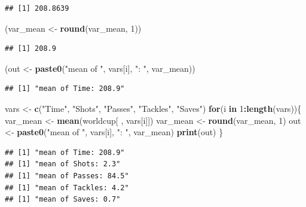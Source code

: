 \documentclass[]{book}
\makeatletter
\newenvironment{Shaded}{\begin{snugshade}}{\end{snugshade}}
\newcommand{\KeywordTok}[1]{\textcolor[rgb]{0.13,0.29,0.53}{\textbf{#1}}}
\newcommand{\DecValTok}[1]{\textcolor[rgb]{0.00,0.00,0.81}{#1}}
\newcommand{\StringTok}[1]{\textcolor[rgb]{0.31,0.60,0.02}{#1}}
\newcommand{\ControlFlowTok}[1]{\textcolor[rgb]{0.13,0.29,0.53}{\textbf{#1}}}
\newcommand{\OperatorTok}[1]{\textcolor[rgb]{0.81,0.36,0.00}{\textbf{#1}}}
\newcommand{\NormalTok}[1]{#1}
\newenvironment{kframe}{%
\medskip{}
\setlength{\fboxsep}{.8em}
 \def\at@end@of@kframe{}%
 \ifinner\ifhmode%
  \def\at@end@of@kframe{\end{minipage}}%
  \begin{minipage}{\columnwidth}%
 \fi\fi%
 \def\FrameCommand##1{\hskip\@totalleftmargin \hskip-\fboxsep
 \colorbox{shadecolor}{##1}\hskip-\fboxsep
     \hskip-\linewidth \hskip-\@totalleftmargin \hskip\columnwidth}%
 \MakeFramed {\advance\hsize-\width
   \@totalleftmargin\z@ \linewidth\hsize
   \@setminipage}}%
 {\par\unskip\endMakeFramed%
 \at@end@of@kframe}
\renewenvironment{Shaded}{\begin{kframe}}{\end{kframe}}
\theoremstyle{definition}
\theoremstyle{definition}
\theoremstyle{definition}
\theoremstyle{remark}
\makeatother
\begin{document}
\begin{verbatim}
## [1] 208.8639
\end{verbatim}

\begin{Shaded}
\begin{Highlighting}[]
\NormalTok{(var_mean <-}\StringTok{ }\KeywordTok{round}\NormalTok{(var_mean, }\DecValTok{1}\NormalTok{))}
\end{Highlighting}
\end{Shaded}

\begin{verbatim}
## [1] 208.9
\end{verbatim}

\begin{Shaded}
\begin{Highlighting}[]
\NormalTok{(out <-}\StringTok{ }\KeywordTok{paste0}\NormalTok{(}\StringTok{"mean of "}\NormalTok{, vars[i], }\StringTok{": "}\NormalTok{, var_mean))}
\end{Highlighting}
\end{Shaded}

\begin{verbatim}
## [1] "mean of Time: 208.9"
\end{verbatim}

\begin{Shaded}
\begin{Highlighting}[]
\NormalTok{vars <-}\StringTok{ }\KeywordTok{c}\NormalTok{(}\StringTok{"Time"}\NormalTok{, }\StringTok{"Shots"}\NormalTok{, }\StringTok{"Passes"}\NormalTok{, }\StringTok{"Tackles"}\NormalTok{, }\StringTok{"Saves"}\NormalTok{)}
\ControlFlowTok{for}\NormalTok{(i }\ControlFlowTok{in} \DecValTok{1}\OperatorTok{:}\KeywordTok{length}\NormalTok{(vars))\{}
\NormalTok{        var_mean <-}\StringTok{ }\KeywordTok{mean}\NormalTok{(worldcup[ , vars[i]])}
\NormalTok{        var_mean <-}\StringTok{ }\KeywordTok{round}\NormalTok{(var_mean, }\DecValTok{1}\NormalTok{)}
\NormalTok{        out <-}\StringTok{ }\KeywordTok{paste0}\NormalTok{(}\StringTok{"mean of "}\NormalTok{, vars[i], }\StringTok{": "}\NormalTok{, var_mean)}
        \KeywordTok{print}\NormalTok{(out)}
\NormalTok{\}}
\end{Highlighting}
\end{Shaded}

\begin{verbatim}
## [1] "mean of Time: 208.9"
## [1] "mean of Shots: 2.3"
## [1] "mean of Passes: 84.5"
## [1] "mean of Tackles: 4.2"
## [1] "mean of Saves: 0.7"
\end{verbatim}
\end{document}
